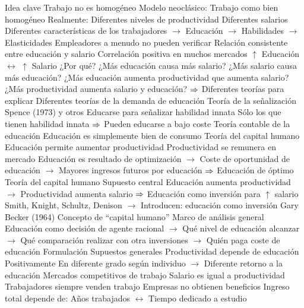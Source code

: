 \documentclass{nuevotema}
\begin{document}
\begin{esquemal}
	\1 
		\2 Idea clave
			\3 Trabajo no es homogéneo
				\4 Modelo neoclásico:
				\4[] Trabajo como bien homogéneo
				\4 Realmente:
				\4[] Diferentes niveles de productividad
				\4[] Diferentes salarios
				\4[] Diferentes características de los trabajadores
				\4[] $\to$ Educación
				\4[] $\to$ Habilidades
				\4[] $\to$ Elasticidades
				\4[] Empleadores a menudo no pueden verificar
			\3 Relación consistente entre educación y salario
				\4 Correlación positiva en muchos mercados
				\4[] $\uparrow$ Educación $\longleftrightarrow$ $\uparrow$ Salario
				\4 ¿Por qué?
				\4[] ¿Más educación causa más salario?
				\4[] ¿Más salario causa más educación?
				\4[] ¿Más educación aumenta productividad que aumenta salario?
				\4[] ¿Más productividad aumenta salario y educación?
				\4[] $\Rightarrow$ Diferentes teorías para explicar
			\3 Diferentes teorías de la demanda de educación
				\4 Teoría de la señalización
				\4[] Spence (1973) y otros
				\4[] Educarse para señalizar habilidad innata
				\4[] Sólo los que tienen habilidad innata
				\4[] $\Rightarrow$ Pueden educarse a bajo coste
				\4 Teoría contable de la educación
				\4[] Educación es simplemente bien de consumo
				\4 Teoría del capital humano
				\4[] Educación permite aumentar productividad
				\4[] Productividad se remunera en mercado
				\4[] Educación es resultado de optimización
				\4[] $\to$ Coste de oportunidad de educación
				\4[] $\to$ Mayores ingresos futuros por educación
				\4[] $\Rightarrow$ Educación de óptimo
			\3 Teoría del capital humano
				\4 Supuesto central
				\4[] Educación aumenta productividad
				\4[] $\to$ Productividad aumenta salario
				\4[] $\Rightarrow$ Educación como inversión para $\uparrow$ salario
				\4 Smith, Knight, Schultz, Denison
				\4[] $\to$ Introducen: educación como inversión
				\4 Gary Becker (1964)
				\4[] Concepto de ``capital humano''
				\4[] Marco de análisis general
				\4[] Educación como decisión de agente racional
				\4[] $\to$ Qué nivel de educación alcanzar
				\4[] $\to$ Qué comparación realizar con otra inversiones
				\4[] $\to$ Quién paga coste de educación
		\2 Formulación
			\3 Supuestos generales
				\4 Productividad depende de educación
				\4[] Positivamente
				\4[] En diferente grado según individuo
				\4[] $\to$ Diferente retorno a la educación
				\4 Mercados competitivos de trabajo
				\4[] Salario es igual a productividad
				\4[] Trabajadores siempre venden trabajo
				\4[] Empresas no obtienen beneficios
				\4 Ingreso total depende de:
				\4[] Años trabajados $\longleftrightarrow$ Tiempo dedicado a estudio

\end{esquemal}
\end{document}
